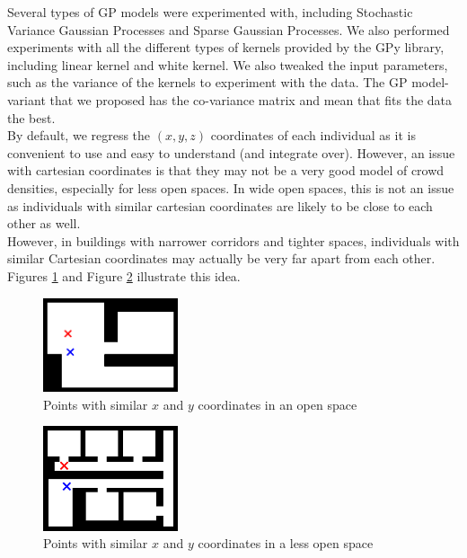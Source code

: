 \documentclass[letterpaper]{article}
\begin{document}
Several types of GP models were experimented with, including Stochastic Variance Gaussian Processes and Sparse Gaussian Processes. We also performed experiments with all the different types of kernels provided by the GPy library, including linear kernel and white kernel. We also tweaked the input parameters, such as the variance of the kernels to experiment with the data. The GP model-variant that we proposed has the co-variance matrix and mean that fits the data the best. \\

By default, we regress the $(x,y,z)$ coordinates of each individual as it is convenient to use and easy to understand (and integrate over). However, an issue with cartesian coordinates is that they may not be a very good model of crowd densities, especially for less open spaces. In wide open spaces, this is not an issue as individuals with similar cartesian coordinates are likely to be close to each other as well.\\

However, in buildings with narrower corridors and tighter spaces, individuals with similar Cartesian coordinates may actually be very far apart from each other. Figures \ref{fig:opspace1} and Figure \ref{fig:opspace2} illustrate this idea.

\begin{figure}[h!]
  \centering
    \includegraphics[width=150px,natwidth=634,natheight=442]{openspace1.png}
  \caption{Points with similar $x$ and $y$ coordinates in an open space}
  \label{fig:opspace1}
\end{figure}

\begin{figure}[h!]
  \centering
    \includegraphics[width=150px,natwidth=570,natheight=442]{openspace2.png}
  \caption{Points with similar $x$ and $y$ coordinates in a less open space}
  \label{fig:opspace2}
\end{figure}
\end{document}
